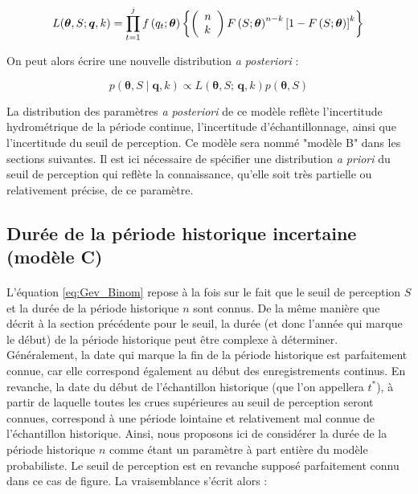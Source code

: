 				\begin{equation}
				L(\boldsymbol{\theta}, S ; \boldsymbol{q}, k) =\prod_{t=1}^j f\left(q_t;\boldsymbol{\theta}\right) \left\{\left(\begin{array}{l}
				n \\
				k
				\end{array}\right) F\left(S;\boldsymbol{\theta}\right)^{n-k}\left[1-F\left(S;\boldsymbol{\theta}\right)\right]^k\right\} \\
				\label{eq:Gev_Binom_uS}
				\end{equation}
				
		On peut alors écrire une nouvelle distribution \textit{a posteriori} : 			
				
				\begin{equation}
					p(\boldsymbol{\theta}, S \mid \boldsymbol{q},k) \propto L(\boldsymbol{\theta},S;\,\boldsymbol{q},k) p(\boldsymbol{\theta},S)
					\label{eq:Bayes_uS}
				\end{equation}
			
		La distribution des paramètres \textit{a posteriori} de ce modèle reflète l'incertitude hydrométrique de la période continue, l'incertitude d'échantillonnage, ainsi que l'incertitude du seuil de perception. Ce modèle sera nommé "modèle B" dans les sections suivantes. Il est ici nécessaire de spécifier une distribution \textit{a priori} du seuil de perception qui reflète la connaissance, qu'elle soit très partielle ou relativement précise, de ce paramètre. 

	\subsection{Durée de la période historique incertaine (modèle C)}
	\label{subsec:modC}
	
		\paragraph{}
		L'équation \ref{eq:Gev_Binom} repose à la fois sur le fait que le seuil de perception $S$ et la durée de la période historique $n$ sont connus. De la même manière que décrit à la section précédente pour le seuil, la durée (et donc l'année qui marque le début) de la période historique peut être complexe à déterminer. Généralement, la date qui marque la fin de la période historique est parfaitement connue, car elle correspond également au début des enregistrements continus. En revanche, la date du début de l'échantillon historique (que l'on appellera $t^{*}$), à partir de laquelle toutes les crues supérieures au seuil de perception seront connues, correspond à une période lointaine et relativement mal connue de l'échantillon historique. Ainsi, nous proposons ici de considérer la durée de la période historique $n$ comme étant un paramètre à part entière du modèle probabiliste. Le seuil de perception est en revanche supposé parfaitement connu dans ce cas de figure. La vraisemblance s'écrit alors : 
		 
